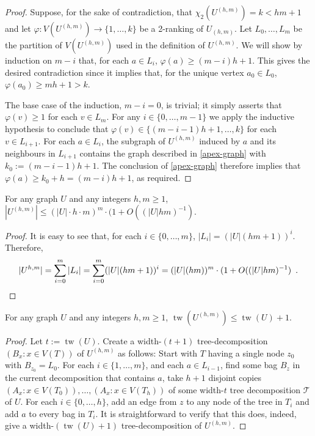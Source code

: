 \documentclass[kpfonts]{patmorin}
\DeclareMathOperator{\tw}{tw}
\newcommand{\trn}{\chi_2}
\theoremstyle{named}
\begin{document}
\begin{proof}
    Suppose, for the sake of contradiction, that $\trn(U^{(h,m)})=k<hm+1$ and let $\varphi:V(U^{(h,m)})\to\{1,\ldots,k\}$ be a 2-ranking of $U_{(h,m)}$.  Let $L_0,\ldots,L_{m}$ be the partition of $V(U^{(h,m)})$ used in the definition of $U^{(h,m)}$. We will show by induction on $m-i$ that, for each $a\in L_{i}$, $\varphi(a)\ge(m-i)h+1$. This gives the desired contradiction since it implies that, for the unique vertex $a_0\in L_0$, $\varphi(a_0)\ge m h+1 > k$.

    The base case of the induction, $m-i=0$, is trivial; it simply asserts that $\varphi(v)\ge 1$ for each $v\in L_m$.  For any $i\in\{0,\ldots,m-1\}$ we apply the inductive hypothesis to conclude that $\varphi(v)\in\{(m-i-1)h+1,\ldots,k\}$ for each $v\in L_{i+1}$.  For each $a\in L_i$, the subgraph of $U^{(h,m)}$ induced by $a$ and its neighbours in $L_{i+1}$ contains the graph described in \cref{apex-graph} with $k_0:=(m-i-1)h+1$.  The conclusion of \cref{apex-graph} therefore implies that $\varphi(a)\ge k_0+h=(m-i)h+1$, as required.
\end{proof}

\begin{lem}\label{boost-size}
    For any graph $U$ and any integers $h,m \ge 1$, $|U^{(h,m)}| \le (|U|\cdot h\cdot m)^{m}\cdot (1+O((|U|hm)^{-1})$.
\end{lem}

\begin{proof}
    It is easy to see that, for each $i\in \{0,\ldots,m\}$, $|L_i|=(|U|(hm+1))^i$.  Therefore,
    \[ |U^{h,m}| = \sum_{i=0}^m |L_i| = \sum_{i=0}^m (|U|(hm+1))^i = (|U|(hm))^{m}\cdot (1+O((|U|hm)^{-1}) \enspace . \qedhere
    \]
\end{proof}


\begin{lem}\label{boost-treewidth}
    For any graph $U$ and any integers $h,m\ge 1$, $\tw(U^{(h,m)})\le \tw(U)+1$.
\end{lem}

\begin{proof}
  Let $t:=\tw(U)$.
  Create a width-$(t+1)$ tree-decomposition $(B_x:x\in V(T))$ of $U^{(h,m)}$ as follows: Start with $T$ having a single node $z_0$ with $B_{z_0}=L_0$.  For each $i\in\{1,\ldots,m\}$, and each $a\in L_{i-1}$, find some bag $B_z$ in the current decomposition that contains $a$, take $h+1$ disjoint copies $(A_x:x\in V(T_0)),\ldots,(A_x:x\in V(T_h))$ of some width-$t$ tree decomposition $\mathcal{T}$ of $U$.  For each $i\in\{0,\ldots,h\}$, add an edge from $z$ to any node of the tree in $T_i$ and add $a$ to every bag in $T_i$.  It is straightforward to verify that this does, indeed, give a width-$(\tw(U)+1)$ tree-decomposition of $U^{(h,m)}$.
\end{proof}
\end{document}
